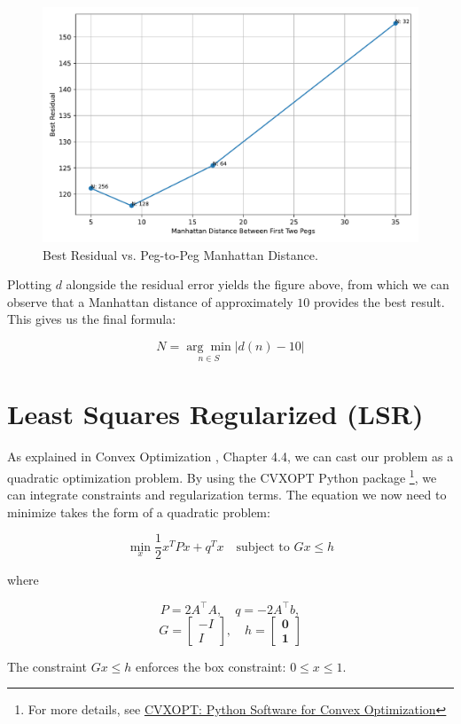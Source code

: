 \begin{figure}[H]
    \centering
    \includegraphics[width=0.5\linewidth]{images/tuning/lls_residuals_by_manhattan_distance.pdf}
    \caption{Best Residual vs. Peg-to-Peg Manhattan Distance.}
    \label{fig:residual_vs_manhattan}
\end{figure}

Plotting \(d\) alongside the residual error yields the figure above, from which we can observe that a Manhattan distance of approximately \(10\) provides the best result. This gives us the final formula:

\[
N = \underset{n \in S}{\arg\min} \left| d(n) - 10 \right|
\]

\section{Least Squares Regularized (LSR)}
\label{sec:lsr}

As explained in Convex Optimization \cite{convex-optimization}, Chapter 4.4, we can cast our problem as a quadratic optimization problem. By using the CVXOPT Python package \footnote{For more details, see \href{https://cvxopt.org/}{CVXOPT: Python Software for Convex Optimization}}, we can integrate constraints and regularization terms. The equation we now need to minimize takes the form of a quadratic problem:

\begin{equation}
\label{eq:qp}
\min_{x} \frac{1}{2} x^TPx + q^Tx \quad \text{subject to } Gx \leq h
\end{equation}

where

\[
P = 2A^\top A, \quad q = -2A^\top b,
\]
\[
G = \begin{bmatrix}
-I \\
I
\end{bmatrix}, \quad
h = \begin{bmatrix}
\mathbf{0} \\
\mathbf{1}
\end{bmatrix}
\]

The constraint \( Gx \leq h \) enforces the box constraint: \(0 \leq x \leq 1\).


